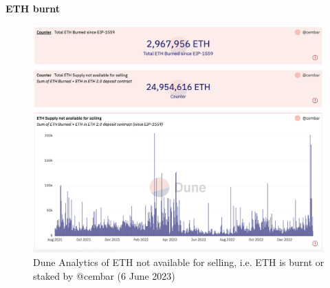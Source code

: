 \documentclass[UTF8]{article}
\begin{document}
\clearpage
\noindent

\textbf{ETH burnt}
\begin{figure}[htbp]
\begin{center}
\includegraphics[width=\linewidth]{images/cembar1}
\caption{Dune Analytics of ETH not available for selling, i.e. ETH is burnt or staked by @cembar (6 June 2023)}
\label{fig:cembar1}
\end{center}
\end{figure}
\end{document}

